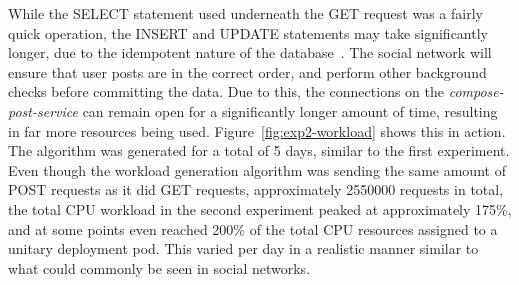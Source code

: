 \begin{center}
\begin{minipage}{\linewidth}
    \label{fig:exp2-workload}
\end{minipage}
\end{center}

While the SELECT statement used underneath the GET request was a fairly quick operation, the INSERT and UPDATE statements may take significantly longer, due to the idempotent nature of the database~\cite{lutteroth2009database}. The social network will ensure that user posts are in the correct order, and perform other background checks before committing the data. Due to this, the connections on the \textit{compose-post-service} can remain open for a significantly longer amount of time, resulting in far more resources being used. Figure~\ref{fig:exp2-workload} shows this in action. The algorithm was generated for a total of 5 days, similar to the first experiment. Even though the workload generation algorithm was sending the same amount of POST requests as it did GET requests, approximately \num[group-separator={,}]{2550000} requests in total, the total CPU workload in the second experiment peaked at approximately 175\%, and at some points even reached 200\% of the total CPU resources assigned to a unitary deployment pod. This varied per day in a realistic manner similar to what could commonly be seen in social networks.\par

